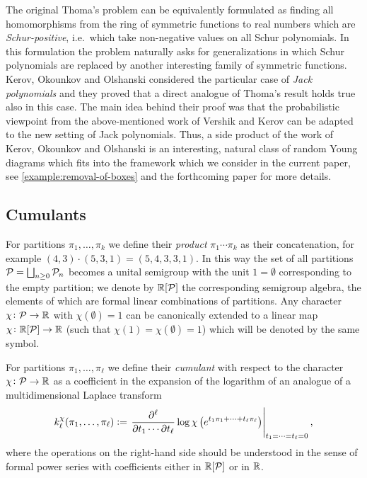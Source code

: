 \documentclass[12pt,usenames,dvipsnames,svgnames,table]{amsart}
\begin{document}
The original Thoma's problem can be equivalently formulated as finding
all homomorphisms from the ring of symmetric functions to real numbers 
which are \emph{Schur-positive}, i.e.~which take non-negative values on all Schur polynomials. 
In this formulation the problem naturally asks for generalizations in which Schur polynomials
are replaced by another interesting family of symmetric functions.
Kerov, Okounkov and Olshanski \cite{KerovOkounkovOlshanski1998} considered the particular case of \emph{Jack polynomials}
and they proved that a direct analogue of Thoma's result holds true also in this case.
The main idea behind their proof was that the probabilistic viewpoint from the
above-mentioned work of Vershik and Kerov \cite{VershikKerov1981a} 
can be adapted to
the new setting of Jack polynomials. 
Thus, a side product of the work of Kerov, Okounkov and Olshanski is an interesting, natural class of 
random Young diagrams which fits 
into the framework which we consider in the current paper, see \cref{example:removal-of-boxes}
and the forthcoming paper \cite{DolegaSniady-examples-AFP} for more details.

\subsection{Cumulants}
\label{sec:concatenation}

For partitions $\pi_1,\dots,\pi_k$ we define their \emph{product} 
$\pi_1 \cdots \pi_k$ as their concatenation,
for example $(4,3) \cdot (5,3,1)=(5,4,3,3,1)$. In this way
the set of all partitions $\mathcal{P}=\bigsqcup_{n\geq 0} \mathcal{P}_{n}$ 
becomes a unital semigroup with the unit $1=\emptyset$ corresponding to the empty partition; 
we denote by $\mathbb{R}[\mathcal{P}]$
the corresponding semigroup algebra, the elements of which are formal linear combinations
of partitions. Any character $\chi\colon\mathcal{P} \to\mathbb{R}$ 
with $\chi(\emptyset)=1$ can be canonically extended 
to a linear map $\chi\colon\mathbb{R}[\mathcal{P}]\to\mathbb{R}$ (such that 
$\chi(1)=\chi(\emptyset)=1$) which will be denoted by the same symbol.

For partitions $\pi_1,\dots,\pi_\ell$ we define their \emph{cumulant} with respect to the 
character $\chi\colon \mathcal{P}\to\mathbb{R}$ as
a coefficient in the expansion of the logarithm of an analogue of a multidimensional
Laplace transform
\begin{equation}
\label{eq:log-laplace}
k^{\chi}_\ell(\pi_1,\dots,\pi_\ell):= 
\left. \frac{\partial^\ell}{\partial t_1 \cdots \partial t_\ell}
\log \chi\left( e^{t_1 \pi_1+\cdots+t_\ell \pi_\ell} \right) 
\right|_{t_1=\cdots=t_\ell=0},
\end{equation}
where the operations on the right-hand side should be understood 
in the sense of formal power series with coefficients 
either in $\mathbb{R}[\mathcal{P}]$ or in $\mathbb{R}$.
\end{document}
